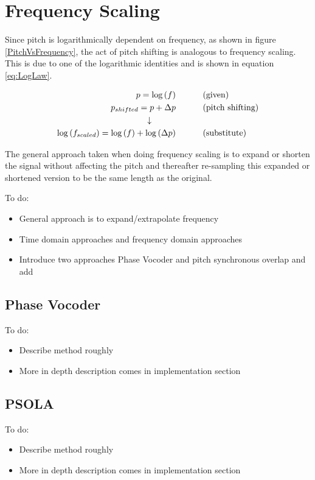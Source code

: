 \section{Frequency Scaling}

Since pitch is logarithmically dependent on frequency, as shown in figure
\ref{PitchVsFrequency}, the act of pitch shifting is analogous to frequency
scaling. This is due to one of the logarithmic identities and is shown in equation
\ref{eq:LogLaw}.

\begin{equation}\label{eq:LogLaw}
\begin{split}
	p=\log{(f)} & \text{\hspace{1cm} (given)}\\
	p_{shifted}=p+\Delta p & \text{\hspace{1cm} (pitch shifting)}\\
	\downarrow \hspace{1cm} \\
	\log{(f_{scaled})}=\log{(f)}+\log{(\Delta p)}
	& \text{\hspace{1cm} (substitute)}
\end{split}
\end{equation}

The general approach taken when doing frequency scaling is to expand or shorten
the signal without affecting the pitch and thereafter re-sampling this expanded or
shortened version to be the same length as the original.

\color{red}
To do:
\begin{itemize}
	\item General approach is to expand/extrapolate frequency
	\item Time domain approaches and frequency domain approaches
	\item Introduce two approaches Phase Vocoder and pitch synchronous overlap and add
\end{itemize}
\color{black}

\subsection{Phase Vocoder}

\color{red}
To do:
\begin{itemize}
	\item Describe method roughly
	\item More in depth description comes in implementation section
\end{itemize}
\color{black}

\subsection{PSOLA}

\color{red}
To do:
\begin{itemize}
	\item Describe method roughly
	\item More in depth description comes in implementation section
\end{itemize}
\color{black}

